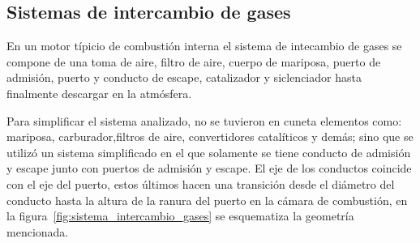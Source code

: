 %
%
%
%
%


\subsection{Sistemas de intercambio de gases}
%
En un motor típicio de combustión interna el sistema de intecambio de gases se
compone de una toma de aire, filtro de aire, cuerpo de mariposa, puerto de
admisión, puerto y conducto de escape, catalizador y siclenciador hasta
finalmente descargar en la atmósfera.

Para simplificar el sistema analizado, no se tuvieron en cuneta elementos como:
mariposa, carburador,filtros de aire, convertidores catalíticos y demás;  sino
que se utilizó un sistema simplificado en el que solamente se tiene conducto de
admisión y escape junto con puertos de admisión y escape.
%
El eje de los conductos coincide con el eje del puerto, estos últimos hacen una
transición desde el diámetro del conducto hasta la altura de la ranura del
puerto en la cámara de combustión, en la
figura~\ref{fig:sistema_intercambio_gases} se esquematiza la geometría
mencionada.

